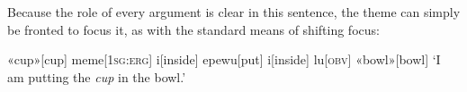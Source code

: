 Because the role of every argument is clear in this sentence, the theme can simply be fronted to focus it, as with the standard means of shifting focus:

\ex
\begingl
\glpreamble
\pronounced{}\endpreamble
«cup»[cup]
meme[\textsc{1sg:erg}]
i[inside]
epewu[put]
i[inside]
lu[\textsc{obv}]
«bowl»[bowl]
\glft `I am putting the \textit{cup} in the bowl.'\footnotemark
\endgl
\xe







